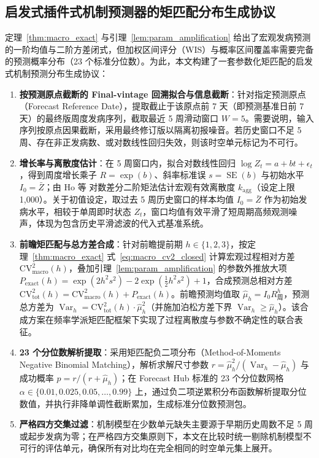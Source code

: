 \documentclass[11pt,a4paper]{article}
\theoremstyle{plain}
\theoremstyle{definition}
\begin{document}
\subsection{启发式插件式机制预测器的矩匹配分布生成协议}\label{sec:mech_predictor_protocol}

定理~\ref{thm:macro_exact} 与引理~\ref{lem:param_amplification} 给出了宏观发病预测的一阶均值与二阶方差闭式，但加权区间评分（WIS）与概率区间覆盖率需要完备的预测概率分布（23 个标准分位数）。为此，本文构建了一套参数化矩匹配的启发式机制预测分布生成协议：
\begin{enumerate}[leftmargin=*,itemsep=0.2pt,topsep=1pt,parsep=0pt]
\item \textbf{按预测原点截断的 Final-vintage 回溯拟合与信息截断}：针对指定预测原点（Forecast Reference Date），提取截止于该原点前 7 天（即预测基准日前 7 天）的最终版周度发病序列，截取最近 5 周滑动窗口 $W=5$。需要说明，输入序列按原点因果截断，采用最终修订版以隔离初报噪音。若历史窗口不足 5 周、存在非正发病数、或对数线性回归失效，则该时空单元标记为不可行。
\item \textbf{增长率与离散度估计}：在 5 周窗口内，拟合对数线性回归 $\log Z_t = a + bt + \epsilon_t$，得到周度增长乘子 $R = \exp(b)$、斜率标准误 $s = \operatorname{SE}(b)$ 与初始水平 $I_0 = \bar{Z}$；由 Ho 等\citep{ho2023simultaneous} 对数差分二阶矩法估计宏观有效离散度 $k_{\text{agg}}$（设定上限 1,000）。关于初值设定，取过去 5 周历史窗口的样本均值 $I_0 = \bar{Z}$ 作为初始发病水平，相较于单周即时状态 $Z_t$，窗口均值有效平滑了短周期高频观测噪声，体现为包含历史平滑滤波的代入式基准系统。
\item \textbf{前瞻矩匹配与总方差合成}：针对前瞻提前期 $h \in \{1, 2, 3\}$，按定理~\ref{thm:macro_exact} 式~\eqref{eq:macro_cv2_closed} 计算宏观过程相对方差 $\text{CV}^2_{\text{macro}}(h)$，叠加引理~\ref{lem:param_amplification} 的参数外推放大项 $P_{\text{exact}}(h) = \exp(2h^2s^2) - 2\exp(\tfrac{1}{2}h^2s^2) + 1$，合成预测总相对方差 $\text{CV}^2_{\text{tot}}(h) = \text{CV}^2_{\text{macro}}(h) + P_{\text{exact}}(h)$。前瞻预测均值取 $\hat{\mu}_h = I_0 R_{\text{周}}^h$，预测总方差为 $\operatorname{Var}_h = \text{CV}^2_{\text{tot}}(h) \cdot \hat{\mu}_h^2$（并施加泊松方差下界 $\operatorname{Var}_h \ge \hat{\mu}_h$）。该合成方案在频率学派矩匹配框架下实现了过程离散度与参数不确定性的联合表征。
\item \textbf{23 个分位数解析提取}：采用矩匹配负二项分布（Method-of-Moments Negative Binomial Matching），解析求解尺寸参数 $r = \hat{\mu}_h^2 / (\operatorname{Var}_h - \hat{\mu}_h)$ 与成功概率 $p = r / (r + \hat{\mu}_h)$；在 Forecast Hub 标准的 23 个分位数网格 $\alpha \in \{0.01, 0.025, 0.05, \dots, 0.99\}$ 上，通过负二项逆累积分布函数解析提取分位数值，并执行非降单调性截断累加，生成标准分位数预测包。
\item \textbf{严格四方交集过滤}：机制模型在少数单元缺失主要源于早期历史周数不足 5 周或起步发病为零；在严格四方交集原则下，本文在比较时统一剔除机制模型不可行的评估单元，确保所有对比均在完全相同的时空单元集上展开。
\end{enumerate}
\end{document}
